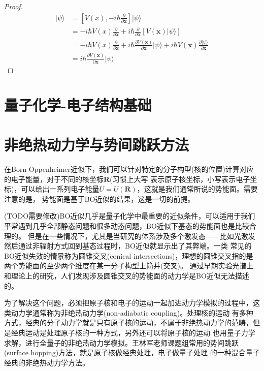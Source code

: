 \documentclass{article}
\newtheorem{proof}{Proof}[section]
\numberwithin{equation}{section}
\newcommand{\ket}[1]{| #1 \rangle}
\begin{document}
\begin{proof}
  \begin{align*}
  [V(\textbf{x}),\textbf{p}] \ket{\psi} & = [V(x),-i\hbar \frac{\partial}{\partial \textbf{x}}]\ket{\psi}\\
  & = -i\hbar V(x) \frac{\partial }{\partial \textbf{x}} + i\hbar \frac{\partial}{\partial \textbf{x}}[V(\textbf{x})\ket{\psi}]\\
  &= -i\hbar V(x) \frac{\partial }{\partial \textbf{x}}+ i\hbar \frac{\partial V(\textbf{x})}{\partial \textbf{x}}\ket{\psi} + i\hbar V(\textbf{x}) \frac{\partial \ket{\psi}}{\partial \textbf{x}}\\
  &= i\hbar \frac{\partial V(\textbf{x})}{\partial \textbf{x}} \ket{\psi}
  \end{align*}
  \end{proof}
    \section{量子化学-电子结构基础}

    \section{非绝热动力学与势间跳跃方法}
    在Born-Oppenheimer近似下，我们可以针对特定的分子构型(核的位置)计算对应的电子能量，对于不同的核坐标$\mathbf{R}$(习惯上大写
    表示原子核坐标，小写表示电子坐标)，可以给出一系列电子能量$U=U(\mathbf{R})$，这就是我们通常所说的势能面。需要注意的是，
    势能面是基于BO近似的结果，这是一切的前提。
    
    (TODO需要修改)BO近似几乎是量子化学中最重要的近似条件，可以适用于我们平常遇到几乎全部静态问题和很多动态问题，BO近似下基态的势能面也是比较合理的。
    但是在一些情况下，尤其是当研究的体系涉及多个激发态——比如光激发然后通过非辐射方式回到基态过程时，BO近似就显示出了其弊端。一类
    常见的BO近似失效的情景称为圆锥交叉(conical intersections)，理想的圆锥交叉指的是两个势能面的至少两个维度在某一分子构型上简并(交叉)。
    通过早期实验光谱上和理论上的研究，人们发现涉及圆锥交叉的势能面的动力学是BO近似无法描述的。
    
    为了解决这个问题，必须把原子核和电子的运动一起加进动力学模拟的过程中，这类动力学通常称为非绝热动力学(non-adiabatic coupling)。处理核的运动
    有多种方式，经典的分子动力学就是只有原子核的运动，不属于非绝热动力学的范畴，但是经典运动是处理原子核的一种方式，另外还可以将原子核的运动
    也用量子力学求解，进行全量子的非绝热动力学模拟。王林军老师课题组常用的势间跳跃(surface hopping)方法，就是原子核做经典处理，电子做量子处理
    的一种混合量子经典的非绝热动力学方法。
\end{document}
